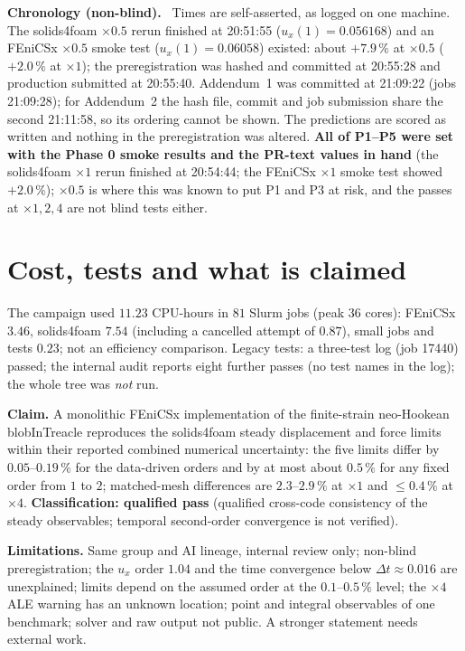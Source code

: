 \documentclass[sn-mathphys,Numbered]{sn-jnl}
\renewcommand{\paragraph}[1]{\par\vspace{0.3\baselineskip}\noindent\textbf{#1}\ }
\newcommand{\FE}{FEniCSx}
\begin{document}
\paragraph{Chronology (non-blind).}
Times are self-asserted, as logged on one machine. The solids4foam $\times0.5$ rerun finished at 20:51:55 ($u_x(1)=0.056168$) and an \FE{} $\times0.5$ smoke test ($u_x(1)=0.06058$) existed: about $+7.9\,\%$ at $\times0.5$ ($+2.0\,\%$ at $\times1$); the preregistration was hashed and committed at 20:55:28 and production submitted at 20:55:40. Addendum~1 was committed at 21:09:22 (jobs 21:09:28); for Addendum~2 the hash file, commit and job submission share the second 21:11:58, so its ordering cannot be shown. The predictions are scored as written and nothing in the preregistration was altered. \textbf{All of P1--P5 were set with the Phase 0 smoke results and the PR-text values in hand} (the solids4foam $\times1$ rerun finished at 20:54:44; the \FE{} $\times1$ smoke test showed $+2.0\,\%$); $\times0.5$ is where this was known to put P1 and P3 at risk, and the passes at $\times1,2,4$ are not blind tests either.

\section{Cost, tests and what is claimed}\label{sec:nh_claim}
The campaign used $11.23$ CPU-hours in $81$ Slurm jobs (peak $36$ cores): \FE{} $3.46$, solids4foam $7.54$ (including a cancelled attempt of $0.87$), small jobs and tests $0.23$; not an efficiency comparison. Legacy tests: a three-test log (job 17440) passed; the internal audit reports eight further passes (no test names in the log); the whole tree was \emph{not} run.

\textbf{Claim.} A monolithic \FE{} implementation of the finite-strain neo-Hookean blobInTreacle reproduces the solids4foam steady displacement and force limits within their reported combined numerical uncertainty: the five limits differ by $0.05$--$0.19\,\%$ for the data-driven orders and by at most about $0.5\,\%$ for any fixed order from $1$ to $2$; matched-mesh differences are $2.3$--$2.9\,\%$ at $\times1$ and $\le0.4\,\%$ at $\times4$. \textbf{Classification: qualified pass} (qualified cross-code consistency of the steady observables; temporal second-order convergence is not verified).

\textbf{Limitations.} Same group and AI lineage, internal review only; non-blind preregistration; the $u_x$ order $1.04$ and the time convergence below $\Delta t\approx0.016$ are unexplained; limits depend on the assumed order at the $0.1$--$0.5\,\%$ level; the $\times4$ ALE warning has an unknown location; point and integral observables of one benchmark; solver and raw output not public. A stronger statement needs external work.
\end{document}
